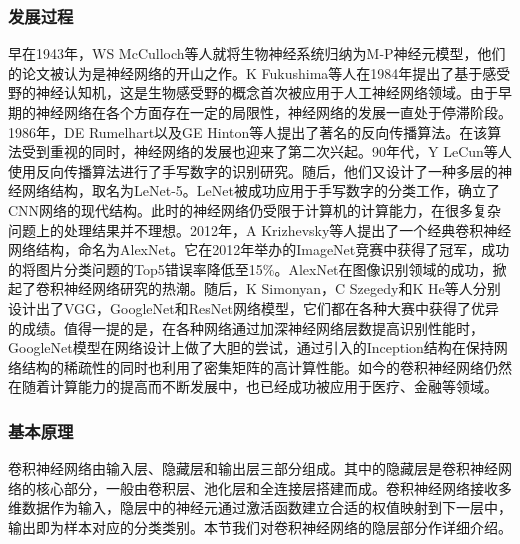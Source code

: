 \subsubsection{发展过程}
早在1943年，WS McCulloch等人就将生物神经系统归纳为M-P神经元模型，他们的论文被认为是神经网络的开山之作\supercite{mcculloch1943logical}。K Fukushima等人在1984年提出了基于感受野的神经认知机，这是生物感受野的概念首次被应用于人工神经网络领域\supercite{fukushima1982neocognitron}。由于早期的神经网络在各个方面存在一定的局限性，神经网络的发展一直处于停滞阶段。1986年，DE Rumelhart以及GE Hinton等人提出了著名的反向传播算法\supercite{7}。在该算法受到重视的同时，神经网络的发展也迎来了第二次兴起。90年代，Y LeCun等人使用反向传播算法进行了手写数字的识别研究\supercite{lecun1990handwritten}。随后，他们又设计了一种多层的神经网络结构，取名为LeNet-5\supercite{6}。LeNet被成功应用于手写数字的分类工作，确立了CNN网络的现代结构。此时的神经网络仍受限于计算机的计算能力，在很多复杂问题上的处理结果并不理想。2012年，A Krizhevsky等人提出了一个经典卷积神经网络结构，命名为AlexNet\supercite{8}。它在2012年举办的ImageNet竞赛中获得了冠军，成功的将图片分类问题的Top5错误率降低至15\%。AlexNet在图像识别领域的成功，掀起了卷积神经网络研究的热潮。随后，K Simonyan，C Szegedy和K He等人分别设计出了VGG\supercite{9}，GoogleNet\supercite{10}和ResNet\supercite{11}网络模型，它们都在各种大赛中获得了优异的成绩。值得一提的是，在各种网络通过加深神经网络层数提高识别性能时，GoogleNet模型在网络设计上做了大胆的尝试，通过引入的Inception结构在保持网络结构的稀疏性的同时也利用了密集矩阵的高计算性能。如今的卷积神经网络仍然在随着计算能力的提高而不断发展中，也已经成功被应用于医疗、金融等领域。

\subsubsection{基本原理}
卷积神经网络由输入层、隐藏层和输出层三部分组成。其中的隐藏层是卷积神经网络的核心部分，一般由卷积层、池化层和全连接层搭建而成。卷积神经网络接收多维数据作为输入，隐层中的神经元通过激活函数建立合适的权值映射到下一层中，输出即为样本对应的分类类别。本节我们对卷积神经网络的隐层部分作详细介绍。

